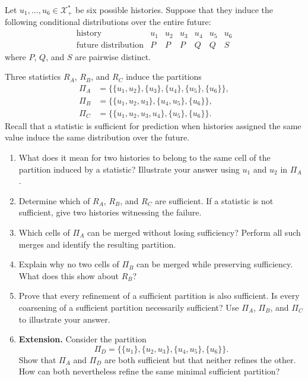 \begin{exercise}
\label{ex:p2-1}
  Let $u_1,\ldots,u_6\in\mathcal X_+^*$ be six possible histories. Suppose
  that they induce the following conditional distributions over the entire
  future:
  \[
    \begin{array}{c|cccccc}
      \text{history} & u_1 & u_2 & u_3 & u_4 & u_5 & u_6\\
      \hline
      \text{future distribution} & P & P & P & Q & Q & S
    \end{array}
  \]
  where $P$, $Q$, and $S$ are pairwise distinct.

  Three statistics $R_A$, $R_B$, and $R_C$ induce the partitions
  \[
    \begin{aligned}
      \Pi_A
        &=\bigl\{\{u_1,u_2\},\{u_3\},\{u_4\},\{u_5\},\{u_6\}\bigr\},\\
      \Pi_B
        &=\bigl\{\{u_1,u_2,u_3\},\{u_4,u_5\},\{u_6\}\bigr\},\\
      \Pi_C
        &=\bigl\{\{u_1,u_2,u_3,u_4\},\{u_5\},\{u_6\}\bigr\}.
    \end{aligned}
  \]
  Recall that a statistic is sufficient for prediction when histories assigned
  the same value induce the same distribution over the future.

  \begin{enumerate}
    \item What does it mean for two histories to belong to the same cell of the
      partition induced by a statistic? Illustrate your answer using $u_1$ and
      $u_2$ in $\Pi_A$.

    \item Determine which of $R_A$, $R_B$, and $R_C$ are sufficient. If a
      statistic is not sufficient, give two histories witnessing the failure.

    \item Which cells of $\Pi_A$ can be merged without losing sufficiency?
      Perform all such merges and identify the resulting partition.

    \item Explain why no two cells of $\Pi_B$ can be merged while preserving
      sufficiency. What does this show about $R_B$?

    \item Prove that every refinement of a sufficient partition is also
      sufficient. Is every coarsening of a sufficient partition necessarily
      sufficient? Use $\Pi_A$, $\Pi_B$, and $\Pi_C$ to illustrate your answer.

    \item \textbf{Extension.} Consider the partition
      \[
        \Pi_D
          =\bigl\{\{u_1\},\{u_2,u_3\},\{u_4,u_5\},\{u_6\}\bigr\}.
      \]
      Show that $\Pi_A$ and $\Pi_D$ are both sufficient but that neither
      refines the other. How can both nevertheless refine the same minimal
      sufficient partition?
  \end{enumerate}
\end{exercise}
